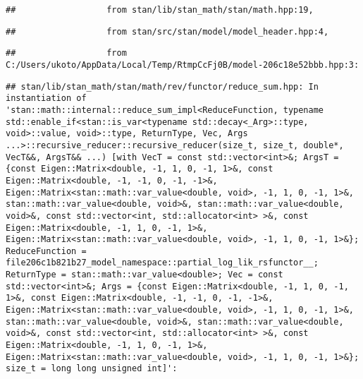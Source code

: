\documentclass[
]{article}
\begin{document}
\begin{verbatim}
##                  from stan/lib/stan_math/stan/math.hpp:19,
\end{verbatim}

\begin{verbatim}
##                  from stan/src/stan/model/model_header.hpp:4,
\end{verbatim}

\begin{verbatim}
##                  from C:/Users/ukoto/AppData/Local/Temp/RtmpCcFj0B/model-206c18e52bbb.hpp:3:
\end{verbatim}

\begin{verbatim}
## stan/lib/stan_math/stan/math/rev/functor/reduce_sum.hpp: In instantiation of 'stan::math::internal::reduce_sum_impl<ReduceFunction, typename std::enable_if<stan::is_var<typename std::decay<_Arg>::type, void>::value, void>::type, ReturnType, Vec, Args ...>::recursive_reducer::recursive_reducer(size_t, size_t, double*, VecT&&, ArgsT&& ...) [with VecT = const std::vector<int>&; ArgsT = {const Eigen::Matrix<double, -1, 1, 0, -1, 1>&, const Eigen::Matrix<double, -1, -1, 0, -1, -1>&, Eigen::Matrix<stan::math::var_value<double, void>, -1, 1, 0, -1, 1>&, stan::math::var_value<double, void>&, stan::math::var_value<double, void>&, const std::vector<int, std::allocator<int> >&, const Eigen::Matrix<double, -1, 1, 0, -1, 1>&, Eigen::Matrix<stan::math::var_value<double, void>, -1, 1, 0, -1, 1>&}; ReduceFunction = file206c1b821b27_model_namespace::partial_log_lik_rsfunctor__; ReturnType = stan::math::var_value<double>; Vec = const std::vector<int>&; Args = {const Eigen::Matrix<double, -1, 1, 0, -1, 1>&, const Eigen::Matrix<double, -1, -1, 0, -1, -1>&, Eigen::Matrix<stan::math::var_value<double, void>, -1, 1, 0, -1, 1>&, stan::math::var_value<double, void>&, stan::math::var_value<double, void>&, const std::vector<int, std::allocator<int> >&, const Eigen::Matrix<double, -1, 1, 0, -1, 1>&, Eigen::Matrix<stan::math::var_value<double, void>, -1, 1, 0, -1, 1>&}; size_t = long long unsigned int]':
\end{verbatim}
\end{document}
